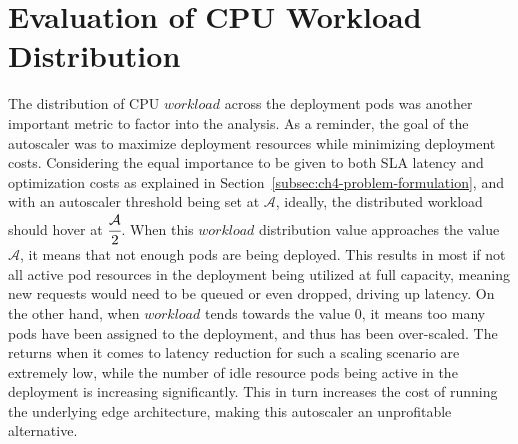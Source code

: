 \section{Evaluation of CPU Workload Distribution}
\label{sec:ch6-cpu-workload-eval}

The distribution of CPU $workload$ across the deployment pods was another important metric to factor into the analysis. As a reminder, the goal of the autoscaler was to maximize deployment resources while minimizing deployment costs. Considering the equal importance to be given to both SLA latency and optimization costs as explained in Section~\ref{subsec:ch4-problem-formulation}, and with an autoscaler threshold being set at $\mathcal{A}$, ideally, the distributed workload should hover at $\cfrac{\mathcal{A}}{2}$. When this $workload$ distribution value approaches the value $\mathcal{A}$, it means that not enough pods are being deployed. This results in most if not all active pod resources in the deployment being utilized at full capacity, meaning new requests would need to be queued or even dropped, driving up latency. On the other hand, when $workload$ tends towards the value $0$, it means too many pods have been assigned to the deployment, and thus has been over-scaled. The returns when it comes to latency reduction for such a scaling scenario are extremely low, while the number of idle resource pods being active in the deployment is increasing significantly. This in turn increases the cost of running the underlying edge architecture, making this autoscaler an unprofitable alternative.\par

